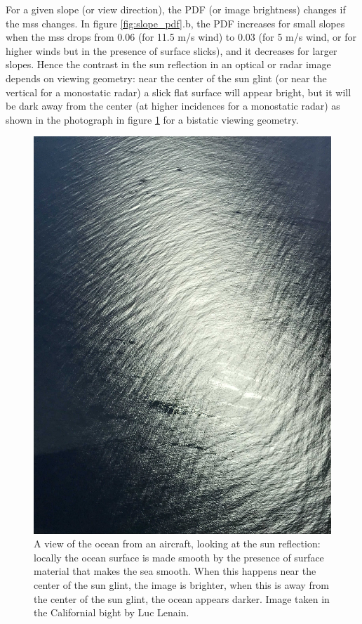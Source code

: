 For a given slope (or view direction), the PDF (or image brightness) changes if the mss changes. In figure \ref{fig:slope_pdf}.b, the PDF increases for small slopes when the mss drops from 0.06 (for 11.5 m/s wind) to 0.03 (for 5 m/s wind, or for higher winds but in the presence of surface slicks), and it decreases for larger slopes. 
 Hence the contrast in the sun reflection in an optical or radar image depends 
on viewing geometry: near the center of the sun glint (or near the vertical for a monostatic radar) a slick flat surface will appear bright, but it will be dark away from the center (at higher incidences for a monostatic radar) as shown in the photograph in figure \ref{fig:slicks} for a bistatic viewing geometry.
\begin{figure}[htb]
\centerline{\includegraphics[width=0.6\linewidth]{FIGS_CH_REMOTE/glitter_and_slicks_small.jpeg}}
\caption[]{A view of the ocean from an aircraft, looking at the sun reflection: locally the ocean surface is made smooth by the presence of surface material that makes the sea smooth. When this happens near the center of the sun glint, the image is brighter, when this is away from the center of the sun glint, the ocean appears darker. Image taken in the Californial bight by Luc Lenain. \label{fig:slicks}}
\end{figure}


